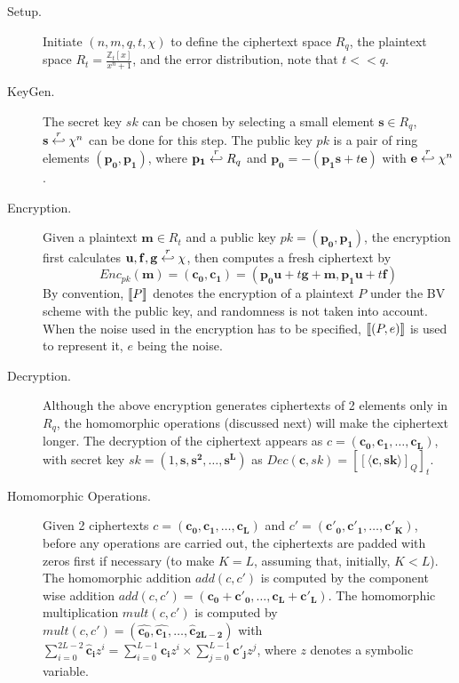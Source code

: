 \begin{description}
\item[Setup.] Initiate $(n,m,q,t, \chi)$ to define the ciphertext space $R_q$,
  the plaintext space $R_t = \frac{\mathbb{Z}_{t}[x]}{x^{n} + 1}$, and the error
  distribution, note that \(t << q\).
\item[KeyGen.] The secret key $sk$ can be chosen by selecting a small element
  $\mathbf{s} \in R_{q}$, $\mathbf{s} \stackrel{r}{\hookleftarrow} \chi^{n}$ can be done for
  this step. The public key $pk$ is a pair of ring elements
  $(\mathbf{p_0},\mathbf{p_1})$, where $\mathbf{p_1} \stackrel{r}{\hookleftarrow} R_q$ and
  $\mathbf{p_0} = -(\mathbf{p_1}\mathbf{s} + t\mathbf{e})$ with
  $\mathbf{e} \stackrel{r}{\hookleftarrow} \chi^{n}$.
\item[Encryption.] Given a plaintext $\mathbf{m} \in R_t$ and a public key
  $pk=(\mathbf{p_0},\mathbf{p_1})$, the encryption first calculates
  $\mathbf{u},\mathbf{f},\mathbf{g} \stackrel{r}{\hookleftarrow} \chi$, then computes a fresh
  ciphertext by
    \[
      Enc_{pk}(\mathbf{m}) = (\mathbf{c_0},\mathbf{c_1}) =
      (\mathbf{p_0}\mathbf{u} + t\mathbf{g} + \mathbf{m},
      \mathbf{p_1}\mathbf{u} + t\mathbf{f})
    \]
    By convention, $\left\llbracket P\right\rrbracket$ denotes the encryption of a plaintext $P$ under the
    BV scheme with the public key, and randomness is not taken into
    account. When the noise used in the encryption has to be specified,
    $\left\llbracket(P,e)\right\rrbracket$ is used to represent it, $e$ being the noise.
  \item[Decryption.] Although the above encryption generates ciphertexts of 2
    elements only in $R_q$, the homomorphic operations (discussed next) will
    make the ciphertext longer. The decryption of the ciphertext appears as
    $c=(\mathbf{c_0},\mathbf{c_1},\dots,\mathbf{c_L})$, with secret key
    $sk = (1, \mathbf{s}, \mathbf{s^2},\dots, \mathbf{s^L})$ as
    $ Dec(\mathbf{c},sk) = \left[\left[ \langle \mathbf{c}, \mathbf{sk} \rangle
      \right]_Q \right]_t $.
  \item[Homomorphic Operations.] Given 2 ciphertexts
    $c = (\mathbf{c_0},\mathbf{c_1},\dots,\mathbf{c_L})$ and
    $c' = (\mathbf{c'_0},\mathbf{c'_1},\dots,\mathbf{c'_{K}})$, before any
    operations are carried out, the ciphertexts are padded with zeros first if
    necessary (to make $K = L$, assuming that, initially, $K < L$).  The
    homomorphic addition $add(c,c')$ is computed by the component wise addition
    $add(c,c') = (\mathbf{c_0} +\mathbf{c'_0}, \dots,
    \mathbf{c_L}+\mathbf{c'_L})$. The homomorphic multiplication $mult(c,c')$ is
    computed by
    $mult(c,c') = (\mathbf{\hat{c_0}}, \mathbf{\hat{c_1}}, \dots,
    \mathbf{\hat{c}_{2L-2}})$ with
    $ \sum_{i=0}^{2L-2}\mathbf{\hat{c}_i}z^i = \sum_{i=0}^{L-1}\mathbf{c_i}z^i
    \times \sum_{j=0}^{L-1}\mathbf{c'_j}z^j $, where $z$ denotes a symbolic
    variable.
\end{description}

